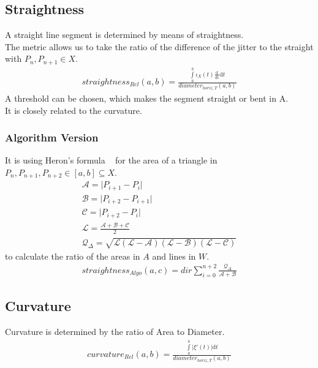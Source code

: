 \documentclass{report}
\begin{document}
\subsection{Straightness}
A straight line segment is determined by means of straightness.\\
The metric allows us to take the ratio of the difference of the jitter to the straight with $P_{n},P_{n+1} \in X$. \\
\begin{align}
straightness_{Rel}(a,b)=\frac{\int \limits _{a}^{b} \iota_{X}(t)\frac{\mathrm{d}}{\mathrm{dt}} \mathrm{d}t}{diameter_{horiz,T}(a,b)}
\end{align}
A threshold can be chosen, which makes the segment straight or bent in A.\\
It is closely related to the curvature.
\subsubsection{Algorithm Version}
It is using Heron's formula ~\cite{Formelsammlung} for the area of a triangle in $P_{n}, P_{n+1},P_{n+2} \in [a,b] \subseteq X$.
\begin{align*}
\mathcal{A}=\lvert P_{i+1}-P_{i} \rvert\\
\mathcal{B}=\lvert P_{i+2} - P_{i+1} \rvert\\
\mathcal{C}=\lvert P_{i+2} - P_{i} \rvert\\
\mathcal{L}=\frac{\mathcal{A}+\mathcal{B}+\mathcal{C}}{2}\\
\mathcal{Q}_{\Delta}=\sqrt{\mathcal{L}(\mathcal{L}-\mathcal{A})(\mathcal{L}-\mathcal{B})(\mathcal{L}-\mathcal{C})}
\end{align*}
to calculate the ratio of the areas in $A$ and lines in $W$.
\begin{align}
straightness_{Algo}(a,c)=dir \sum_{i=0}^{n+2}\frac{\mathcal{Q}_{\Delta}}{\mathcal{A}+\mathcal{B}}
\end{align}

\subsection{Curvature}
Curvature is determined by the ratio of Area to Diameter.
\begin{align}
curvature_{Rel}(a,b) = \frac{\int \limits _{a}^{b} \lvert \xi'(t) \rvert \mathrm{d}t}{diameter_{horiz,T}(a,b)}
\end{align}
\end{document}
